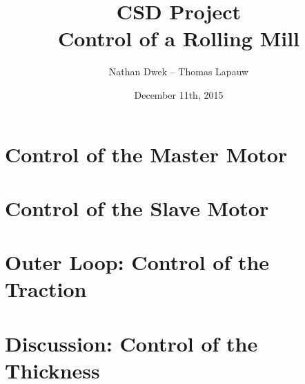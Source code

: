 

\title{CSD Project\\ Control of a Rolling Mill}
\author{Nathan Dwek -- Thomas Lapauw}
\date{December 11th, 2015}


\frame{\titlepage}

\section{Control of the Master Motor}

\section{Control of the Slave Motor}

\section{Outer Loop: Control of the Traction}

\section{Discussion: Control of the Thickness}



